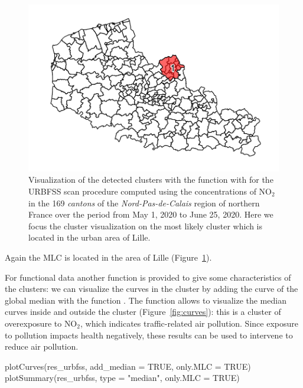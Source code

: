 \begin{figure}[htbp]
\centering
\includegraphics[width=0.49\linewidth]{MLC_urbfss.pdf}
\caption{Visualization of the detected clusters with the function  with  for the URBFSS scan procedure computed using the concentrations of $\text{NO}_2$ in the 169 \textit{cantons} of the \textit{Nord-Pas-de-Calais} region of northern France over the period from May 1, 2020 to June 25, 2020. Here we focus the cluster visualization on the most likely cluster which is located in the urban area of Lille.}
\label{fig:mlc_urbfss}
\end{figure}

\noindent Again the MLC is located in the area of Lille (Figure~\ref{fig:mlc_urbfss}). 

\noindent For functional data another function is provided to give some characteristics of the clusters: we can visualize the curves in the cluster by adding the curve of the global median with the function . The function  allows to visualize the median curves inside and outside the cluster (Figure~\ref{fig:curves}): this is a cluster of overexposure to $\text{NO}_2$, which indicates traffic-related air pollution. Since exposure to pollution impacts health negatively, these results can be used to intervene to reduce air pollution.

\begin{example}
 plotCurves(res_urbfss, add_median = TRUE, only.MLC = TRUE)
 plotSummary(res_urbfss, type = "median", only.MLC = TRUE)
\end{example}

